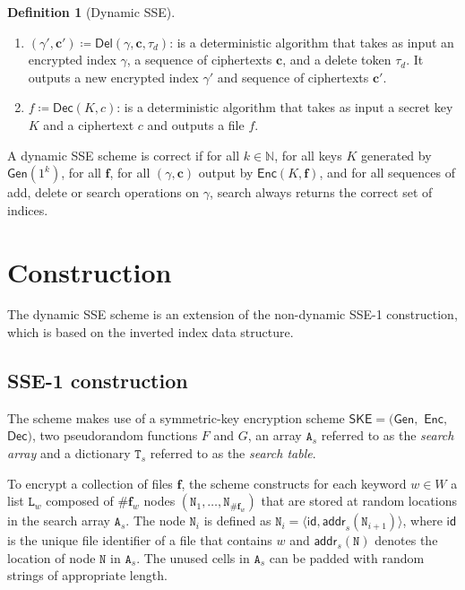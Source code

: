 \documentclass[12pt,a4paper]{article}
\theoremstyle{definition}
\newtheorem{definition}{Definition}
\begin{document}
\begin{definition}[Dynamic SSE]
\begin{enumerate}
\item \((\gamma', \mathbf{c}') \coloneqq \mathsf{Del}(\gamma, \mathbf{c},
	\tau_d)\): is a deterministic algorithm that takes as input an
	encrypted index \(\gamma\), a sequence of ciphertexts \(\mathbf{c}\),
	and a delete token \(\tau_d\). It outputs a new encrypted index
	\(\gamma'\) and sequence of ciphertexts \(\mathbf{c}'\).

\item \(f \coloneqq \mathsf{Dec}(K, c)\): is a deterministic algorithm
	that takes as input a secret key \(K\) and a ciphertext \(c\) and
	outputs a file \(f\).
\end{enumerate}

A dynamic SSE scheme is correct if for all \(k \in \mathbb{N}\), for all
keys \(K\) generated by \(\mathsf{Gen}(1^k)\), for all \(\mathbf{f}\), for all
\((\gamma, \mathbf{c})\) output by \(\mathsf{Enc}(K, \mathbf{f})\), and
for all sequences of add, delete or search operations on \(\gamma\), search
always returns the correct set of indices.
\end{definition}
\clearpage


\section{Construction}

The dynamic SSE scheme is an extension of the non-dynamic SSE-1 construction,
which is based on the inverted index data structure.

\subsection{SSE-1 construction}

The scheme makes use of a symmetric-key encryption scheme
\(\mathsf{SKE = (Gen,}\) \(\mathsf{Enc,}\) \(\mathsf{Dec)}\),
two pseudorandom functions \(F\) and \(G\),
an array \(\mathtt{A}_s\) referred to as the \emph{search array} and a
dictionary \(\mathtt{T}_s\) referred to as the \emph{search table}.

To encrypt a collection of files \(\mathbf{f}\), the scheme constructs
for each keyword \(w \in W\) a list \(\mathtt{L}_w\) composed of
\(\#\mathbf{f}_w\) nodes
\((\mathtt{N}_1, \dotsc, \mathtt{N}_{\#\mathbf{f}_w})\) that are stored at
random locations in the search array \(\mathtt{A}_s\). The node
\(\mathtt{N}_i\) is defined as
\(\mathtt{N}_i = \langle \mathsf{id, addr}_s(\mathtt{N}_{i+1}) \rangle\),
where \(\mathsf{id}\) is the unique file identifier of a file that contains
\(w\) and \(\mathsf{addr}_s(\mathtt{N})\) denotes the location of
node \(\mathtt{N}\) in \(\mathtt{A}_s\).
The unused cells in \(\mathtt{A}_s\) can be padded with random strings of
appropriate length.
\end{document}
